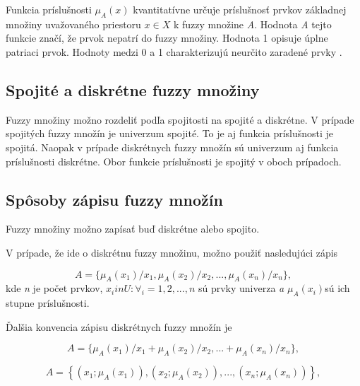 \begin{defn}
	Funkcia príslušnosti $\mu_A\left( x\right)$ kvantitatívne určuje príslušnosť prvkov základnej množiny uvažovaného priestoru $x \in X$ k fuzzy množine \textit{A}. Hodnota\textit{ A} tejto funkcie značí, že prvok nepatrí do fuzzy množiny. Hodnota 1 opisuje úplne patriaci prvok. Hodnoty medzi 0 a 1 charakterizujú neurčito zaradené prvky \cite{levashenkoProj, Kaufman1985, Klir1995, Navara2011}. \end{defn}


\subsection*{Spojité a diskrétne fuzzy množiny}
Fuzzy množiny možno rozdeliť podľa spojitosti na spojité a diskrétne. V prípade spojitých fuzzy množín je univerzum spojité. To je aj funkcia príslušnosti je spojitá. Naopak v prípade diskrétnych fuzzy množín sú univerzum aj funkcia príslušnosti diskrétne. Obor funkcie príslušnosti je spojitý v oboch prípadoch.  \cite{gregorUI} 


\subsection*{Spôsoby zápisu fuzzy množín}
Fuzzy množiny možno zapísať buď diskrétne alebo spojito.

V prípade, že ide o diskrétnu fuzzy množinu, možno použiť nasledujúci zápis \cite{gregorref1, gregorUI}

\begin{equation}\label{disk0}
A = \{\mu_A(x_1)/x_1, \mu_A(x_2)/x_2, ... , \mu_A(x_n)/x_n\}, 
\end{equation}
kde \textit{n} je počet prvkov, $x_i in U : \forall_i = 1, 2, ..., n$ sú prvky univerza \textit{a} $\mu_A(x_i)$sú ich stupne príslušnosti.

Ďalšia konvencia zápisu diskrétnych fuzzy množín je  \cite{gregorUI} 

\begin{equation}\label{disk1}
A = \{\mu_A(x_1)/x_1 + \mu_A(x_2)/x_2, ...  + \mu_A(x_n)/x_n\}, 
\end{equation}

\begin{equation}\label{disk2}
A = \left\lbrace 
\left( x_1; \mu_A\left( x_1\right)  \right) , 
\left( x_2; \mu_A\left( x_2\right)  \right) , ... , 
\left( x_n; \mu_A\left( x_n\right)  \right) 
\right\rbrace , 
\end{equation}

